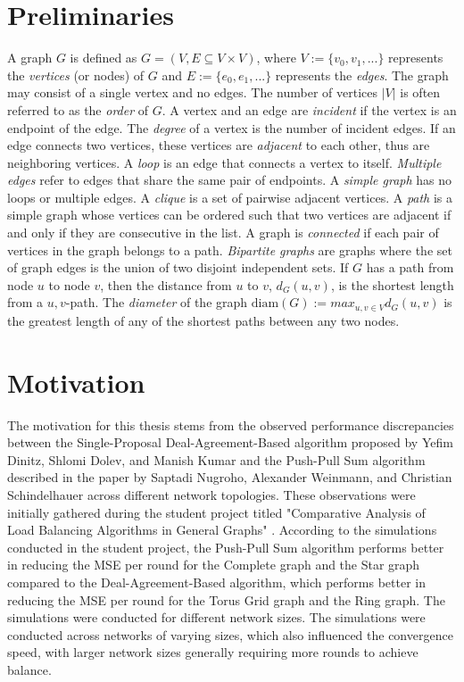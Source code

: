 \section{Preliminaries}\label{sec:prelimn}
A graph $G$ is defined as $G = (V, E \subseteq V \times V)$, where $V := \{v_0, v_1,...\}$ represents the \textit{vertices} (or nodes) of $G$ and $E := \{e_0, e_1,...\}$ represents the \textit{edges}. The graph may consist of a single vertex and no edges. The number of vertices $|V|$ is often referred to as the \textit{order} of $G$. A vertex and an edge are \textit{incident} if the vertex is an endpoint of the edge. The \textit{degree} of a vertex is the number of incident edges. If an edge connects two vertices, these vertices are \textit{adjacent} to each other, thus are neighboring vertices. A \textit{loop} is an edge that connects a vertex to itself. \textit{Multiple edges} refer to edges that share the same pair of endpoints. A \textit{simple graph} has no loops or multiple edges. A \textit{clique} is a set of pairwise adjacent vertices. A \textit{path} is a simple graph whose vertices can be ordered such that two vertices are adjacent if and only if they are consecutive in the list. A graph is \textit{connected} if each pair of vertices in the graph belongs to a path. \textit{Bipartite graphs} are graphs where the set of graph edges is the union of two disjoint independent sets. If $G$ has a path from node $u$ to node $v$, then the distance from $u$ to $v$, $d_G(u,v)$, is the shortest length from a $u,v$-path. The \textit{diameter} of the graph $\text{diam} (G) := max_{u,v\in V}d_G(u,v)$ is the greatest length of any of the shortest paths between any two nodes. \cite{GraphTheorySchindelhaauer2021}

\section{Motivation}\label{sec:motivation}
The motivation for this thesis stems from the observed performance discrepancies between the Single-Proposal Deal-Agreement-Based algorithm proposed by Yefim Dinitz, Shlomi Dolev, and Manish Kumar \cite{Dinitz2023DAB} and the Push-Pull Sum algorithm described in the paper by Saptadi Nugroho, Alexander Weinmann, and Christian Schindelhauer \cite{nugroho2023PushPullSumDataAg} across different network topologies. These observations were initially gathered during the student project titled "Comparative Analysis of Load Balancing Algorithms in General Graphs" \cite{Bayazitoglu}. According to the simulations conducted in the student project, the Push-Pull Sum algorithm performs better in reducing the MSE per round for the Complete graph and the Star graph compared to the Deal-Agreement-Based algorithm, which performs better in reducing the MSE per round for the Torus Grid graph and the Ring graph. The simulations were conducted for different network sizes. The simulations were conducted across networks of varying sizes, which also influenced the convergence speed, with larger network sizes generally requiring more rounds to achieve balance.

